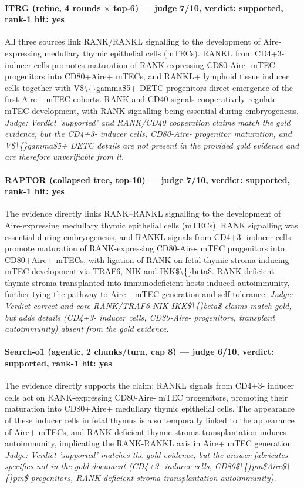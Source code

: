 \documentclass[sigconf, review, anonymous]{acmart}
\begin{document}
\paragraph{ITRG (refine, 4 rounds $\times$ top-6) --- judge 7/10, verdict: supported, rank-1 hit: yes}
\noindent All three sources link RANK/RANKL signalling to the development of Aire-expressing medullary thymic epithelial cells (mTECs). RANKL from CD4+3- inducer cells promotes maturation of RANK-expressing CD80-Aire- mTEC progenitors into CD80+Aire+ mTECs, and RANKL+ lymphoid tissue inducer cells together with V\$\textbackslash\{\}gamma\$5+ DETC progenitors direct emergence of the first Aire+ mTEC cohorts. RANK and CD40 signals cooperatively regulate mTEC development, with RANK signalling being essential during embryogenesis.
\noindent\small\textit{Judge: Verdict 'supported' and RANK/CD40 cooperation claims match the gold evidence, but the CD4+3- inducer cells, CD80-Aire- progenitor maturation, and V\$\textbackslash\{\}gamma\$5+ DETC details are not present in the provided gold evidence and are therefore unverifiable from it.}
\paragraph{RAPTOR (collapsed tree, top-10) --- judge 7/10, verdict: supported, rank-1 hit: yes}
\noindent The evidence directly links RANK--RANKL signalling to the development of Aire-expressing medullary thymic epithelial cells (mTECs). RANK signalling was essential during embryogenesis, and RANKL signals from CD4+3- inducer cells promote maturation of RANK-expressing CD80-Aire- mTEC progenitors into CD80+Aire+ mTECs, with ligation of RANK on fetal thymic stroma inducing mTEC development via TRAF6, NIK and IKK\$\textbackslash\{\}beta\$. RANK-deficient thymic stroma transplanted into immunodeficient hosts induced autoimmunity, further tying the pathway to Aire+ mTEC generation and self-tolerance.
\noindent\small\textit{Judge: Verdict correct and core RANK/TRAF6-NIK-IKK\$\textbackslash\{\}beta\$ claims match gold, but adds details (CD4+3- inducer cells, CD80-Aire- progenitors, transplant autoimmunity) absent from the gold evidence.}
\paragraph{Search-o1 (agentic, 2 chunks/turn, cap 8) --- judge 6/10, verdict: supported, rank-1 hit: yes}
\noindent The evidence directly supports the claim: RANKL signals from CD4+3- inducer cells act on RANK-expressing CD80-Aire- mTEC progenitors, promoting their maturation into CD80+Aire+ medullary thymic epithelial cells. The appearance of these inducer cells in fetal thymus is also temporally linked to the appearance of Aire+ mTECs, and RANK-deficient thymic stroma transplantation induces autoimmunity, implicating the RANK-RANKL axis in Aire+ mTEC generation.
\noindent\small\textit{Judge: Verdict 'supported' matches the gold evidence, but the answer fabricates specifics not in the gold document (CD4+3- inducer cells, CD80\$\textbackslash\{\}pm\$Aire\$\textbackslash\{\}pm\$ progenitors, RANK-deficient stroma transplantation autoimmunity).}
\end{document}
